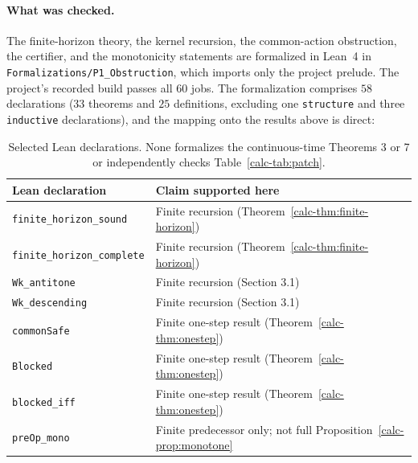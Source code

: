 \documentclass[10pt,twocolumn]{article}
\theoremstyle{definition}
\begin{document}
\paragraph{What was checked.} The finite-horizon theory, the kernel recursion, the
common-action obstruction, the certifier, and the monotonicity statements are formalized in Lean~4 in \texttt{Formalizations/P1\_Obstruction}, which imports only the
project prelude. The project's recorded build passes all \(60\) jobs. The formalization comprises \(58\) declarations (\(33\) theorems and \(25\) definitions, excluding one \texttt{structure} and three \texttt{inductive} declarations), and the mapping onto the results above is
direct:

\begin{table}[tbp]
\centering
\scriptsize
\setlength{\tabcolsep}{2pt}
\begin{tabular}{@{}>{\raggedright\arraybackslash}p{}>{\raggedright\arraybackslash}p{}@{}}
\toprule
Lean declaration & Claim supported here\\
\midrule
\texttt{finite\_horizon\_sound} & Finite recursion (Theorem~\ref{calc-thm:finite-horizon})\\
\texttt{finite\_horizon\_complete} & Finite recursion (Theorem~\ref{calc-thm:finite-horizon})\\
\texttt{Wk\_antitone} & Finite recursion (Section 3.1)\\
\texttt{Wk\_descending} & Finite recursion (Section 3.1)\\
\texttt{commonSafe} & Finite one-step result (Theorem~\ref{calc-thm:onestep})\\
\texttt{Blocked} & Finite one-step result (Theorem~\ref{calc-thm:onestep})\\
\texttt{blocked\_iff} & Finite one-step result (Theorem~\ref{calc-thm:onestep})\\
\texttt{preOp\_mono} & Finite predecessor only; not full Proposition~\ref{calc-prop:monotone}\\
\bottomrule
\end{tabular}
\caption{Selected Lean declarations. None formalizes the continuous-time Theorems 3 or 7 or independently checks Table~\ref{calc-tab:patch}.}
\label{calc-tab:lean-scope}
\end{table}
\end{document}
